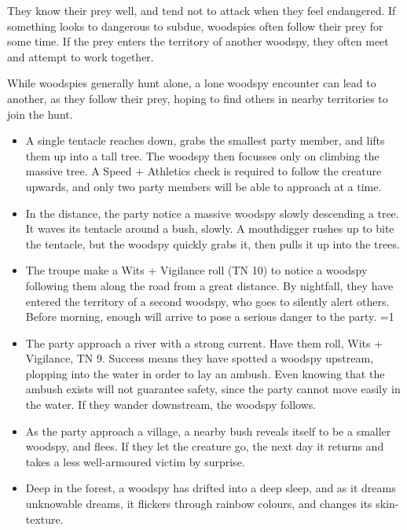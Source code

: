 \begin{multicols}{2}
They know their prey well, and tend not to attack when they feel endangered.
If something looks to dangerous to subdue, woodspies often follow their prey for some time.
If the prey enters the territory of another woodspy, they often meet and attempt to work together.

While woodspies generally hunt alone, a lone woodspy encounter can lead to another, as they follow their prey, hoping to find others in nearby territories to join the hunt.

\begin{itemize}

  \item
  A single tentacle reaches down, grabs the smallest party member, and lifts them up into a tall tree.
  The woodspy then focusses only on climbing the massive tree.
  A Speed + Athletics check is required to follow the creature upwards, and only two party members will be able to approach at a time.
  \item
  In the distance, the party notice a massive woodspy slowly descending a tree.
  It waves its tentacle around a bush, slowly.
  A mouthdigger rushes up to bite the tentacle, but the woodspy quickly grabs it, then pulls it up into the trees.
  \item
  The troupe make a Wits + Vigilance roll (TN 10) to notice a woodspy following them along the road from a great distance.
  By nightfall, they have entered the territory of a second woodspy, who goes to silently alert others.
  Before morning, enough will arrive to pose a serious danger to the party.
  \ifodd\value{temperature}=1
    \item
    The party approach a river with a strong current.
    Have them roll, Wits + Vigilance, TN 9.
    Success means they have spotted a woodspy upstream, plopping into the water in order to lay an ambush.
    Even knowing that the ambush exists will not guarantee safety, since the party cannot move easily in the water.
    If they wander downstream, the woodspy follows.
  \else
    \item
    As the party approach a village, a nearby bush reveals itself to be a smaller woodspy, and flees.
    If they let the creature go, the next day it returns and takes a less well-armoured victim by surprise.
    \item
    Deep in the forest, a woodspy has drifted into a deep sleep, and as it dreams unknowable dreams, it flickers through rainbow colours, and changes its skin-texture.
  \fi

\end{itemize}

\end{multicols}

